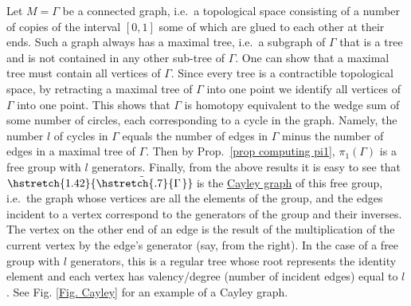 \documentclass[english,letterpaper]{article}%
\numberwithin{equation}{section}
\numberwithin{figure}{section}
\numberwithin{table}{section}
\theoremstyle{definition}
\theoremstyle{definition}
\theoremstyle{definition}
\theoremstyle{plain}
\theoremstyle{plain}
\theoremstyle{plain}
\theoremstyle{plain}
\theoremstyle{remark}
\theoremstyle{remark}
\newcommand\wt[1]{\hstretch{1.42}{\tilde{\hstretch{.7}{#1\mkern2mu}}}\mkern-2mu}
\begin{document}
\begin{example}
    Let $M=\Gamma$ be a connected graph, i.e.\ a topological space consisting of a number of copies of the interval $[0,1]$ some of which are glued to each other at their ends. Such a graph always has a maximal tree, i.e.\ a subgraph of $\Gamma$ that is a tree and is not contained in any other sub-tree of $\Gamma$. One can show that a maximal tree must contain all vertices of $\Gamma$. Since every tree is a contractible topological space, by retracting a maximal tree of $\Gamma$ into one point we identify all vertices of $\Gamma$ into one point. This shows that $\Gamma$ is homotopy equivalent to the wedge sum of some number of circles, each corresponding to a cycle in the graph. Namely, the number $l$ of cycles in $\Gamma$ equals the number of edges in $\Gamma$ minus the number of edges in a maximal tree of $\Gamma$. Then by Prop.\ \ref{prop computing pi1}, $\pi_1(\Gamma)$  is a free group with $l$ generators. Finally, from the above results it is easy to see that $\wt{\Gamma}$ is the \href{https://en.wikipedia.org/wiki/Cayley_graph}{Cayley graph} of this free group, i.e.\ the graph whose vertices are all the elements of the group, and the edges incident to a vertex correspond to the generators of the group and their inverses. The vertex on the other end of an edge is the result of the multiplication of the current vertex by the edge's generator (say, from the right). In the case of a free group with $l$ generators, this is a regular tree whose root represents the identity element and each vertex has valency/degree (number of incident edges) equal to $l$. See Fig. \ref{Fig. Cayley} for an example of a Cayley graph.
    

\end{example}
\end{document}
